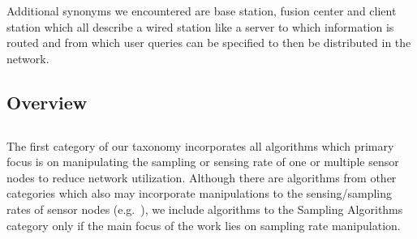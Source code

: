 \par
\par
Additional synonyms we encountered are base station, fusion center and client
station which all describe a wired station like a server to which information
is routed and from which user queries can be specified to then be distributed
in the network.

\subsection{Overview}
\label{sec:Overview}


\subsection{\catI} %
\label{sec:catI}

The first category of our taxonomy incorporates all algorithms which primary
focus is on manipulating the sampling or sensing rate of one or multiple sensor
nodes to reduce network utilization. Although there are algorithms from other
categories which also may incorporate manipulations to the sensing/sampling
rates of sensor nodes (e.g.~\cite{trihinas2015adam, jain2004adaptive}), we
include algorithms to the Sampling Algorithms category only if the main focus
of the work lies on sampling rate manipulation. %

